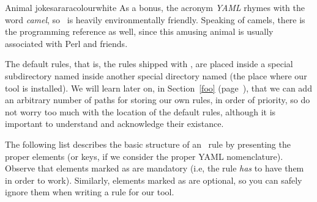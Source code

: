 \begin{messagebox}{Animal jokes}{araracolour}{\icok}{white}
As a bonus, the acronym \emph{YAML} rhymes with the word \emph{camel}, so \arara\ is heavily environmentally friendly. Speaking of camels, there is the programming reference as well, since this amusing animal is usually associated with Perl and friends.
\end{messagebox}

The default rules, that is, the rules shipped with \arara, are placed inside a special subdirectory named  inside another special directory named  (the place where our tool is installed). We will learn later on, in Section~\ref{foo} (page~\pageref{foo}), that we can add an arbitrary number of paths for storing our own rules, in order of priority, so do not worry too much with the location of the default rules, although it is important to understand and acknowledge their existance.

The following list describes the basic structure of an \arara\ rule by presenting the proper elements (or keys, if we consider the proper YAML nomenclature). Observe that elements marked as  are mandatory (i.e, the rule \emph{has} to have them in order to work). Similarly, elements marked as  are optional, so you can safely ignore them when writing a rule for our tool.

